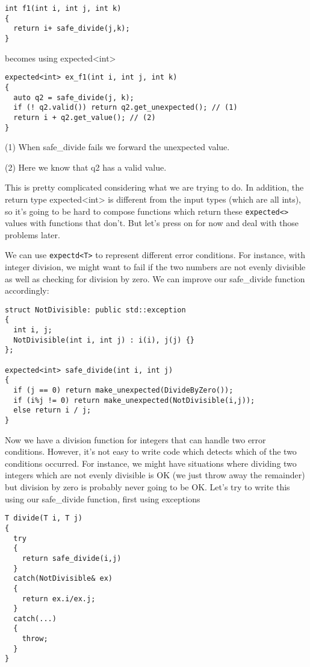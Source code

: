 \documentclass[a4paper,10pt]{article}
\newcommand{\cpp}[1]{\lstinline{#1}}
\begin{document}
\begin{lstlisting}
int f1(int i, int j, int k)
{
  return i+ safe_divide(j,k);
}
\end{lstlisting}

becomes using expected<int> 

\begin{lstlisting}
expected<int> ex_f1(int i, int j, int k)
{
  auto q2 = safe_divide(j, k);
  if (! q2.valid()) return q2.get_unexpected(); // (1)
  return i + q2.get_value(); // (2)
}
\end{lstlisting}

(1) When safe_divide fails we forward the unexpected value.

(2) Here we know that q2 has a valid value.

This is pretty complicated considering what we are trying to do. In addition, the return type expected<int> is different from the input types (which are all ints), so it's going to be hard to compose functions which return these \cpp{expected<>} values with functions that don't. But let's press on for now and deal with those problems later.

We can use \cpp{expectd<T>} to represent different error conditions. For instance, with integer division, we might want to fail if the two numbers are not evenly divisible as well as checking for division by zero. We can improve our safe_divide function accordingly:

\begin{lstlisting}
struct NotDivisible: public std::exception
{
  int i, j;
  NotDivisible(int i, int j) : i(i), j(j) {}
};

expected<int> safe_divide(int i, int j)
{
  if (j == 0) return make_unexpected(DivideByZero()); 
  if (i%j != 0) return make_unexpected(NotDivisible(i,j));
  else return i / j; 
}
\end{lstlisting}

Now we have a division function for integers that can handle two error conditions. However, it's not easy to write code which detects which of the two conditions occurred. For instance, we might have situations where dividing two integers which are not evenly divisible is OK (we just throw away the remainder) but division by zero is probably never going to be OK. Let's try to write this using our safe_divide function, first using exceptions


\begin{lstlisting}
T divide(T i, T j)
{
  try
  {
    return safe_divide(i,j)
  }
  catch(NotDivisible& ex)
  {
    return ex.i/ex.j;
  }
  catch(...)
  {
    throw;
  }
}
\end{lstlisting}
\end{document}
